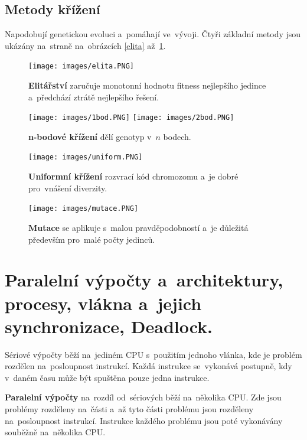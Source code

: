 \subsection{Metody křížení}

Napodobují genetickou evoluci a~pomáhají ve~vývoji. Čtyři základní metody jsou ukázány na~straně \pageref{elita} na~obrázcích \ref{elita} až~\ref{mutace}.

\begin{figure}[ht]
	\centering
	\texttt{[image: images/elita.PNG]}
	\caption{\textbf{Elitářství} zaručuje monotonní hodnotu fitness nejlepšího jedince a~předchází ztrátě nejlepšího řešení.}
	\label{elita}

	\texttt{[image: images/1bod.PNG]}
	\texttt{[image: images/2bod.PNG]}
	\caption{\textbf{n-bodové křížení} dělí genotyp v~\( n \) bodech.}
	\label{1bod2bod}

	\texttt{[image: images/uniform.PNG]}
	\caption{\textbf{Uniformní křížení} rozvrací kód chromozomu a~je dobré pro~vnášení diverzity.}
	\label{uniform}

	\texttt{[image: images/mutace.PNG]}
	\caption{\textbf{Mutace} se aplikuje s~malou pravděpodobností a~je důležitá především pro~malé počty jedinců.}
	\label{mutace}
\end{figure}

\clearpage
\section{Paralelní výpočty a~architektury, procesy, vlákna a~jejich synchronizace, Deadlock.}

Sériové výpočty běží na~jediném CPU s~použitím jednoho vlánka, kde je problém rozdělen na~posloupnost instrukcí. Každá instrukce se~vykonává postupně, kdy v~daném času může být spuštěna pouze jedna instrukce.

\textbf{Paralelní výpočty} na~rozdíl od~sériových běží na~několika CPU. Zde jsou problémy rozděleny na~části a~až tyto části problému jsou rozděleny na~posloupnost instrukcí. Instrukce každého problému jsou poté vykonávány souběžně na~několika CPU.

